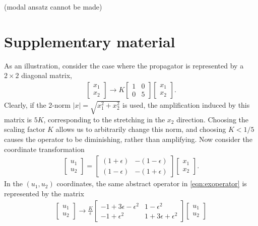 \documentclass[letterpaper,10pt,prl,twocolumn,aps,reprint,superscriptaddress]{revtex4-1}
\begin{document}
(modal ansatz cannot be made)


% 

\newpage
\section*{Supplementary material}
As an illustration, consider the case where the propagator is represented by a $2\times 2$ diagonal matrix,
\begin{align}
 \begin{bmatrix} x_1 \\ x_2 \end{bmatrix}
 \to
K \begin{bmatrix} 1 & 0 \\ 0 & 5 \end{bmatrix}
 \begin{bmatrix} x_1 \\ x_2 \end{bmatrix}.
 \label{eqn:exoperator}
\end{align}
Clearly, if the 2-norm $|x| = \sqrt{x_1^2 +x_2^2}$ is used, the amplification induced by this matrix is $5K$, corresponding to the stretching in the $x_2$ direction. Choosing the scaling factor $K$ allows us to arbitrarily change this norm, and choosing $K<1/5$ causes the operator to be diminishing, rather than amplifying. Now consider the coordinate transformation
\begin{align}
 \begin{bmatrix} u_1 \\ u_2 \end{bmatrix}
 =
 \begin{bmatrix} (1+\epsilon) & -(1-\epsilon) \\ (1-\epsilon) & -(1+\epsilon) \end{bmatrix}
 \begin{bmatrix} x_1 \\ x_2 \end{bmatrix}.
 \label{eqn:transform}
\end{align}
In the $(u_1, u_2)$ coordinates, the same abstract operator in \eqref{eqn:exoperator} is represented by the matrix
\begin{align}
 \begin{bmatrix} u_1 \\ u_2 \end{bmatrix}
 \to \frac{K}{\epsilon}
 \begin{bmatrix} -1+3\epsilon-\epsilon^2 & 1-\epsilon^2 \\ -1+\epsilon^2 & 1+3\epsilon+\epsilon^2 \end{bmatrix}
 \begin{bmatrix} u_1 \\ u_2 \end{bmatrix}
\end{align}
\end{document}
